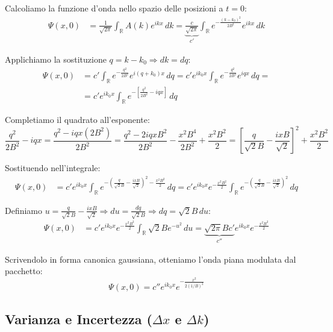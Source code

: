 \documentclass[11pt, a4paper]{article}
\begin{document}
Calcoliamo la funzione d'onda nello spazio delle posizioni a $t=0$: %
\begin{align*}
    \Psi(x,0) &= \frac{1}{\sqrt{2\pi}} \int_{\mathbb{R}} A(k) e^{ikx} \, dk = \underbrace{\frac{c}{\sqrt{2\pi}}}_{c'} \int_{\mathbb{R}} e^{-\frac{(k-k_0)^2}{2B^2}} e^{ikx} \, dk %
\end{align*}

Applichiamo la sostituzione $q = k - k_0 \Rightarrow dk = dq$: %
\begin{align*}
    \Psi(x,0) &= c' \int_{\mathbb{R}} e^{-\frac{q^2}{2B^2}} e^{i(q+k_0)x} \, dq = c' e^{ik_0 x} \int_{\mathbb{R}} e^{-\frac{q^2}{2B^2}} e^{iqx} \, dq = \\ %
    &= c' e^{ik_0 x} \int_{\mathbb{R}} e^{-\left[ \frac{q^2}{2B^2} - iqx \right]} \, dq %
\end{align*}

Completiamo il quadrato all'esponente: %
\begin{equation*}
    \frac{q^2}{2B^2} - iqx = \frac{q^2 - iqx(2B^2)}{2B^2} = \frac{q^2 - 2iqxB^2}{2B^2} - \frac{x^2 B^4}{2B^2} + \frac{x^2 B^2}{2} = \left[ \frac{q}{\sqrt{2}B} - \frac{ixB}{\sqrt{2}} \right]^2 + \frac{x^2 B^2}{2} %
\end{equation*}

Sostituendo nell'integrale: %
\begin{align*}
    \Psi(x,0) &= c' e^{ik_0 x} \int_{\mathbb{R}} e^{-\left( \frac{q}{\sqrt{2}B} - \frac{ixB}{\sqrt{2}} \right)^2 - \frac{x^2 B^2}{2}} \, dq = c' e^{ik_0 x} e^{-\frac{x^2 B^2}{2}} \int_{\mathbb{R}} e^{-\left( \frac{q}{\sqrt{2}B} - \frac{ixB}{\sqrt{2}} \right)^2} \, dq %
\end{align*}

Definiamo $u = \frac{q}{\sqrt{2}B} - \frac{ixB}{\sqrt{2}} \Rightarrow du = \frac{dq}{\sqrt{2}B} \Rightarrow dq = \sqrt{2}B \, du$: %
\begin{align*}
    \Psi(x,0) &= c' e^{ik_0 x} e^{-\frac{x^2 B^2}{2}} \int_{\mathbb{R}} \sqrt{2}B e^{-u^2} \, du = \underbrace{\sqrt{2\pi} B c'}_{c''} e^{ik_0 x} e^{-\frac{x^2 B^2}{2}} %
\end{align*}

Scrivendolo in forma canonica gaussiana, otteniamo l'onda piana modulata dal pacchetto: %
\begin{equation}
    \boxed{ \Psi(x,0) = c'' e^{ik_0 x} e^{-\frac{x^2}{2(1/B)^2}} } %
\end{equation}

\subsection{Varianza e Incertezza ($\Delta x$ e $\Delta k$)} %
\end{document}

